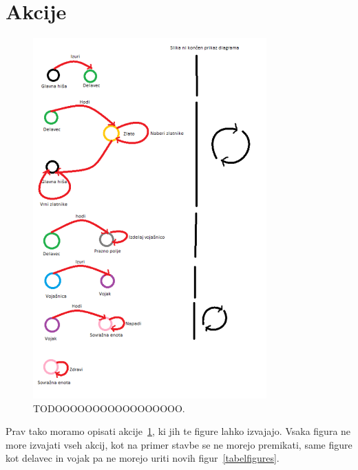 \documentclass[a4paper, 12pt]{book}
\begin{document}
\section{Akcije}

\begin{figure}[h]
	\begin{center}
		\includegraphics[width=0.8\textwidth]{photos/prikazAkcij.pdf}
	\end{center}
	\caption{TODOOOOOOOOOOOOOOOOO.}
	\label{picActions}
\end{figure}





Prav tako moramo opisati akcije~\ref{picActions}, ki jih te figure lahko izvajajo. 
Vsaka figura ne more izvajati vseh akcij, kot na primer stavbe se ne morejo premikati, same figure kot delavec in vojak pa ne morejo uriti novih figur~\ref{tabelfigures}.
\end{document}
